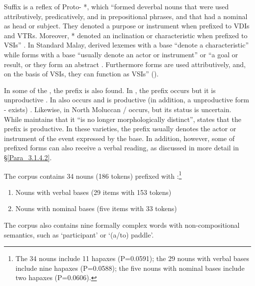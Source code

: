 Suffix  is a reflex of Proto- *\textitbf{-}, which “formed deverbal nouns that were used attributively, predicatively, and in prepositional phrases, and that had a nominal as head or subject. They denoted a purpose or instrument when prefixed to VDIs and VTRs. Moreover, *\textitbf{-} denoted an inclination or characteristic when prefixed to VSIs” \citep[193]{Adelaar.1992}. In Standard Malay, derived lexemes with a  base “denote a characteristic” while forms with a  base “usually denote an actor or instrument” or “a goal or result, or they form an abstract . Furthermore \textitbf{-} forms are used attributively, and, on the basis of VSIs, they can function as VSIs” (\citeyear*[183]{Adelaar.1992}).



In some of the , the prefix is also found. In , the prefix occurs but it is unproductive \citep[109]{vanMinde.1997}. In   also occurs and is productive (in addition, a unproductive form \textsc{-} exists) \citep[18, 24]{Stoel.2005}. Likewise, in North Moluccan /  \textitbf{)-} occurs, but its status is uncertain. While {\citet[4]{Voorhoeve.1983}} maintains that it “is no longer morphologically distinct”, \citet[30]{Litamahuputty.2012} states that the prefix is productive. In these varieties, the prefix usually denotes the actor or instrument of the event expressed by the base. In addition, however, some of prefixed forms can also receive a verbal reading, as discussed in more detail in §\ref{Para_3.1.4.2}.



The corpus contains 34 nouns (186 tokens) prefixed with :\footnote{The 34 nouns include 11 hapaxes (P=0.0591); the 29 nouns with verbal bases include nine hapaxes (P=0.0588); the five nouns with nominal bases include two hapaxes (P=0.0606).}


\begin{enumerate}
\item 
Nouns with verbal bases (29 items with 153 tokens)
\item 
Nouns with nominal bases (five items with 33 tokens)
\
\end{enumerate}

The corpus also contains nine formally complex words with non-compositional semantics, such as  ‘participant’ or  ‘(a/to) paddle’.



